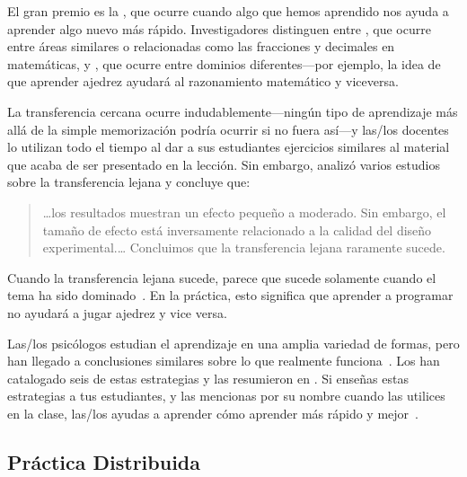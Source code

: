 El gran premio es la ,
que ocurre cuando algo que hemos aprendido nos ayuda a aprender algo nuevo más rápido.
Investigadores distinguen entre ,
que ocurre entre áreas similares o relacionadas como las fracciones y decimales en matemáticas,
y ,
que ocurre entre dominios diferentes---por ejemplo,
la idea de que aprender ajedrez ayudará al razonamiento matemático y viceversa.

La transferencia cercana ocurre indudablemente---ningún tipo de aprendizaje
más allá de la simple memorización podría ocurrir si no fuera así---y
las/los docentes lo utilizan todo el tiempo
al dar a sus estudiantes ejercicios similares al material que acaba de ser presentado en la lección.
Sin embargo,
\cite{Sala2017} analizó varios estudios sobre la transferencia lejana
y concluye que:

\begin{quote}

  {\ldots}los resultados muestran un efecto pequeño a moderado.
  Sin embargo, el tamaño de efecto está inversamente relacionado a la calidad del diseño experimental.{\ldots}
  Concluimos que la transferencia lejana raramente sucede.

\end{quote}

Cuando la transferencia lejana sucede,
parece que sucede solamente cuando el tema ha sido dominado~\cite{Gick1987}.
En la práctica,
esto significa que aprender a programar no ayudará a jugar ajedrez y vice versa.


Las/los psicólogos estudian el aprendizaje en una amplia variedad de formas,
pero han llegado a conclusiones similares sobre lo que realmente funciona~\cite{Mark2018}.
Los 
han catalogado seis de estas estrategias y
las resumieron en .
Si enseñas estas estrategias a tus estudiantes,
y las mencionas por su nombre cuando las utilices en la clase,
las/los ayudas a aprender cómo aprender más rápido y mejor~\cite{Wein2018a,Wein2018b}.

\subsection*{Práctica Distribuida}

